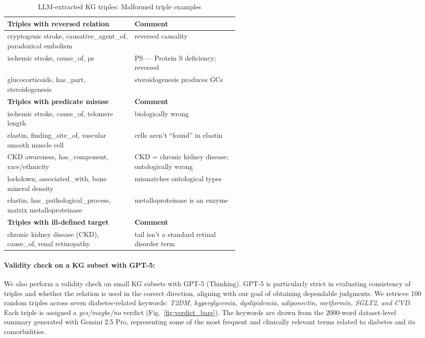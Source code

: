 \documentclass[10pt]{article}
\begin{document}
\begin{table}[h]
  \centering
  \caption{LLM-extracted KG triples: Malformed triple examples}
  \label{tab:llm-malformed_triple}
  \small
  \begingroup
  \setlength{\tabcolsep}{4pt} %
  \begin{tabularx}{\linewidth}{p{0.55\linewidth} X}
    \toprule
    \rowcolor{gray!30}
    \textbf{Triples with reversed relation} & \textbf{Comment} \\
    \midrule
    cryptogenic stroke, causative\_agent\_of, paradoxical embolism & reversed causality \\
    ischemic stroke, cause\_of, ps & PS — Protein S deficiency; reversed \\
    glucocorticoids, has\_part, steroidogenesis & steroidogenesis produces GCs \\
    \midrule
    \rowcolor{gray!30}
    \textbf{Triples with predicate misuse} & \textbf{Comment} \\
    \midrule
    ischemic stroke, cause\_of, telomere length & biologically wrong\\
    elastin,  finding\_site\_of, vascular smooth muscle cell & cells aren't ``found'' in elastin\\
    CKD awareness, has\_component, race/ethnicity & CKD = chronic kidney disease; ontologically wrong\\
    lockdown, associated\_with, bone mineral density & mismatches ontological types\\
    elastin, has\_pathological\_process, matrix metalloproteinase & metalloproteinase is an enzyme\\
    \midrule
    \rowcolor{gray!30}
    \textbf{Triples with ill-defined target} & \textbf{Comment} \\
    chronic kidney disease (CKD), cause\_of, renal retinopathy & tail isn’t a standard retinal disorder term\\
    \bottomrule
  \end{tabularx}
  \endgroup
\end{table}


\paragraph{Validity check on a KG subset with GPT-5:} We also perform a validity check on small KG subsets with GPT-5 (Thinking). GPT-5 is particularly strict in evaluating consistency of triples and whether the relation is used in the correct direction, aligning with our goal of obtaining dependable judgments. We retrieve 100 random triples across seven diabetes-related keywords: \textit{T2DM, hyperglycemia, dyslipidemia, adiponectin, metformin, SGLT2, and CVD}. Each triple is assigned a \textit{yes/maybe/no} verdict (Fig.~\ref{fig:verdict_bars}). The keywords are drawn from the 2000-word dataset-level summary generated with Gemini 2.5 Pro, representing some of the most frequent and clinically relevant terms related to diabetes and its comorbidities. 
\end{document}
